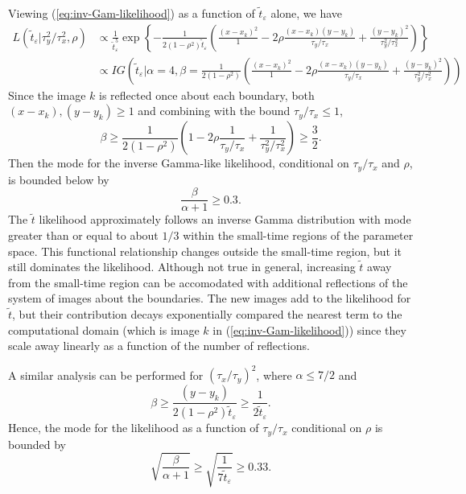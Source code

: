 \documentclass[10pt]{article}
\begin{document}
\begin{enumerate}
    Viewing (\ref{eq:inv-Gam-likelihood}) as a function of
    $\tilde{t}_\varepsilon$ alone, we have
    \begin{align*}
      L(\tilde{t}_\varepsilon | \tau_y^2/\tau_x^2, \rho) &\propto
                                                           \frac{1}{\tilde{t}_\varepsilon^5} \exp\left\{
                                                           -\frac{1}{2(1-\rho^2)\tilde{t}_\varepsilon} \left( \frac{(x -
                                                           x_k)^2}{1} - 2\rho \frac{(x-x_k)(y-y_k)}{\tau_y/\tau_x} +
                                                           \frac{(y - y_k)^2}{\tau_y^2/\tau_x^2} \right) \right\} \\
                                                         &\propto IG\left( \tilde{t}_\varepsilon | \alpha = 4, \beta = \frac{1}{2(1-\rho^2)} \left( \frac{(x -
                                                           x_k)^2}{1} - 2\rho \frac{(x-x_k)(y-y_k)}{\tau_y/\tau_x} +
                                                           \frac{(y - y_k)^2}{\tau_y^2/\tau_x^2} \right)\right)
      \end{align*}
      Since the image $k$ is reflected once about each boundary, both
      $(x-x_k), (y-y_k) \geq 1$ and combining with the bound $\tau_y/\tau_x \leq 1$,
      \[
        \beta \geq \frac{1}{2(1-\rho^2)} \left( 1 - 2\rho
          \frac{1}{\tau_y/\tau_x} + \frac{1}{\tau_y^2/\tau_x^2}
        \right) \geq \frac{3}{2}.
      \]
      Then the mode for the inverse Gamma-like likelihood, conditional on
      $\tau_y/\tau_x$ and $\rho$, is bounded below by
      \[
        \frac{\beta}{\alpha+1} \geq 0.3.
      \]
      The $\tilde{t}$ likelihood approximately follows an inverse
      Gamma distribution with mode greater than or equal to about
      $1/3$ within the small-time regions of the parameter space. This
      functional relationship changes outside the small-time region,
      but it still dominates the likelihood. Although not true in
      general, increasing $\tilde{t}$ away from the small-time region
      can be accomodated with additional reflections of the system of
      images about the boundaries. The new images add to the
      likelihood for $\tilde{t}$, but their contribution decays
      exponentially compared the nearest term to the computational
      domain (which is image $k$ in (\ref{eq:inv-Gam-likelihood})) since they
      scale away linearly as a function of the number of reflections.

      A similar analysis can be performed for $(\tau_x/\tau_y)^2$, where $\alpha \leq 7/2$ and
      \[
        \beta \geq \frac{(y-y_k)}{2(1-\rho^2)\tilde{t}_\varepsilon} \geq \frac{1}{2\tilde{t}_\varepsilon}.
      \]
      Hence, the mode for the likelihood as a function of
      $\tau_y/\tau_x$ conditional on $\rho$ is bounded by
      \[
        \sqrt{\frac{\beta}{\alpha+1}} \geq \sqrt{\frac{1}{7\tilde{t}_\varepsilon}} \geq 0.33.
      \]


\end{enumerate}
\end{document}
